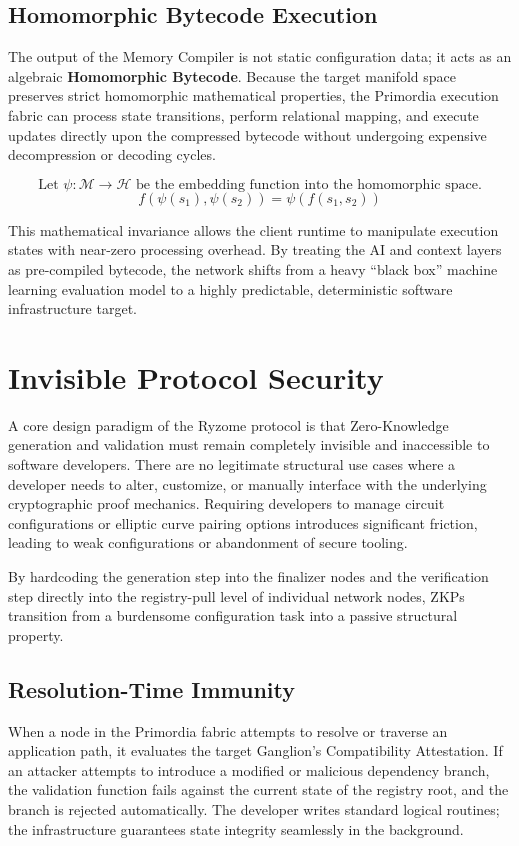 \documentclass{article}
\begin{document}
\subsection{Homomorphic Bytecode Execution}
The output of the Memory Compiler is not static configuration data; it acts as an algebraic \textbf{Homomorphic Bytecode}. Because the target manifold space preserves strict homomorphic mathematical properties, the Primordia execution fabric can process state transitions, perform relational mapping, and execute updates directly upon the compressed bytecode without undergoing expensive decompression or decoding cycles. 

$$\text{Let } \psi: \mathcal{M} \to \mathcal{H} \text{ be the embedding function into the homomorphic space.}$$
$$f(\psi(s_1), \psi(s_2)) = \psi(f(s_1, s_2))$$

This mathematical invariance allows the client runtime to manipulate execution states with near-zero processing overhead. By treating the AI and context layers as pre-compiled bytecode, the network shifts from a heavy ``black box'' machine learning evaluation model to a highly predictable, deterministic software infrastructure target.

\section{Invisible Protocol Security}
A core design paradigm of the Ryzome protocol is that Zero-Knowledge generation and validation must remain completely invisible and inaccessible to software developers. There are no legitimate structural use cases where a developer needs to alter, customize, or manually interface with the underlying cryptographic proof mechanics. Requiring developers to manage circuit configurations or elliptic curve pairing options introduces significant friction, leading to weak configurations or abandonment of secure tooling.

By hardcoding the generation step into the finalizer nodes and the verification step directly into the registry-pull level of individual network nodes, ZKPs transition from a burdensome configuration task into a passive structural property.

\subsection{Resolution-Time Immunity}
When a node in the Primordia fabric attempts to resolve or traverse an application path, it evaluates the target Ganglion's Compatibility Attestation. If an attacker attempts to introduce a modified or malicious dependency branch, the validation function fails against the current state of the registry root, and the branch is rejected automatically. The developer writes standard logical routines; the infrastructure guarantees state integrity seamlessly in the background. 
\end{document}
